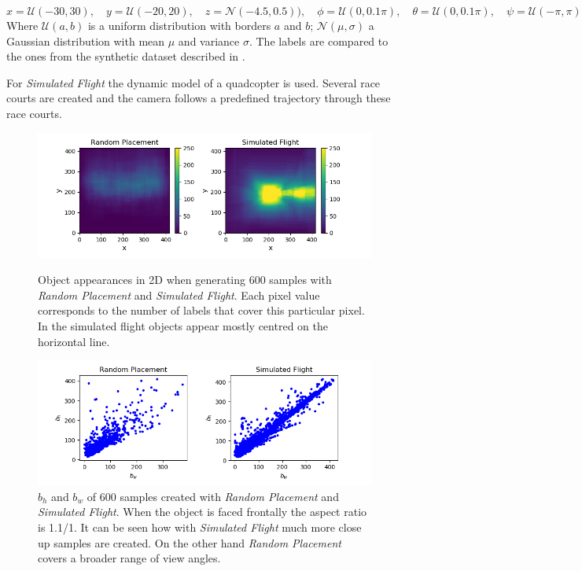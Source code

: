 \begin{equation}
x = \mathcal{U}(-30,30),\quad y = \mathcal{U}(-20,20),\quad z = \mathcal{N}(-4.5,0.5)),\quad
\phi = \mathcal{U}(0,0.1\pi),\quad \theta = \mathcal{U}(0,0.1\pi),\quad \psi = \mathcal{U}(-\pi,\pi)
\label{eq:distroexp}
\end{equation}
Where $\mathcal{U}(a,b)$ is a uniform distribution with borders $a$ and $b$; $\mathcal{N}(\mu,\sigma)$ a Gaussian distribution with mean $\mu$ and variance $\sigma$. The labels are compared to the ones from the synthetic dataset described in .

For \textit{Simulated Flight} the dynamic model of a quadcopter is used. Several race courts are created and the camera follows a predefined trajectory through these race courts.

\begin{figure}
	\begin{minipage}{\textwidth}
		\includegraphics[width=\textwidth]{fig/heatmap_camplace}
		\caption{Object appearances in 2D when generating 600 samples with \textit{Random Placement} and  \textit{Simulated Flight}. Each pixel value corresponds to the number of labels that cover this particular pixel. In the simulated flight objects appear mostly centred on the horizontal line.}
		\label{fig:heatmap_camplace}
	\end{minipage}
	\begin{minipage}{\textwidth}
	\includegraphics[width=\textwidth]{fig/ar_train}
	\caption{$b_h$ and $b_w$ of 600 samples created with \textit{Random Placement} and  \textit{Simulated Flight}. When the object is faced frontally the aspect ratio is 1.1/1. It can be seen how with \textit{Simulated Flight} much more close up samples are created. On the other hand \textit{Random Placement} covers a broader range of view angles.}
	\label{fig:aspect_ratio_camplace}
	\end{minipage}
\end{figure}

